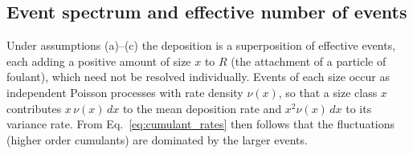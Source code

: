 \documentclass[preprint,12pt]{elsarticle}
\begin{document}

\subsection{Event spectrum and effective number of events}
\label{sec:activity}
 
Under assumptions (a)--(c) the deposition is a superposition of effective
events, each adding a positive amount of size $x$ to $R$ 
(the attachment of a particle of foulant), which need not
be resolved individually. 
Events of each size occur as independent Poisson
processes with rate density $\nu(x)$, so that a
size class $x$ contributes $x\,\nu(x)\,dx$ to the mean 
deposition rate and
$x^2\nu(x)\,dx$ to its variance rate. From 
Eq.~\eqref{eq:cumulant_rates} then follows that the fluctuations
(higher order cumulants) are dominated by the larger events.
 
\end{document}
